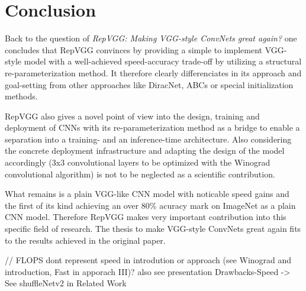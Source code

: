 \section{Conclusion} \label{conclusion}

Back to the question of \textit{RepVGG: Making VGG-style ConvNets great again?} one concludes that RepVGG convinces by providing a simple to implement VGG-style model with a well-achieved speed-accuracy trade-off by utilizing a structural re-parameterization method. It therefore clearly differenciates in its approach and goal-setting from other approaches like DiracNet, ABCs or special initialization methods. 

RepVGG also gives a novel point of view into the design, training and deployment of CNNs with its re-parameterization method as a bridge to enable a separation into a training- and an inference-time architecture. Also considering the concrete deployment infrastructure and adapting the design of the model accordingly (3x3 convolutional layers to be optimized with the Winograd convolutional algorithm) is not to be neglected as a scientific contribution. 

What remains is a plain VGG-like CNN model with noticable speed gains and the first of its kind achieving an over 80\% acuracy mark on ImageNet \cite{JiaDeng.2009} as a plain CNN model. Therefore RepVGG makes very important contribution into this specific field of research. The thesis to make VGG-style ConvNets great again fits to the results achieved in the original paper. 



// FLOPS dont represent speed in introdution or approach (see Winograd and introduction, Fast in apporach III)? also see presentation Drawbacks-Speed -> See shuffleNetv2 in Related Work